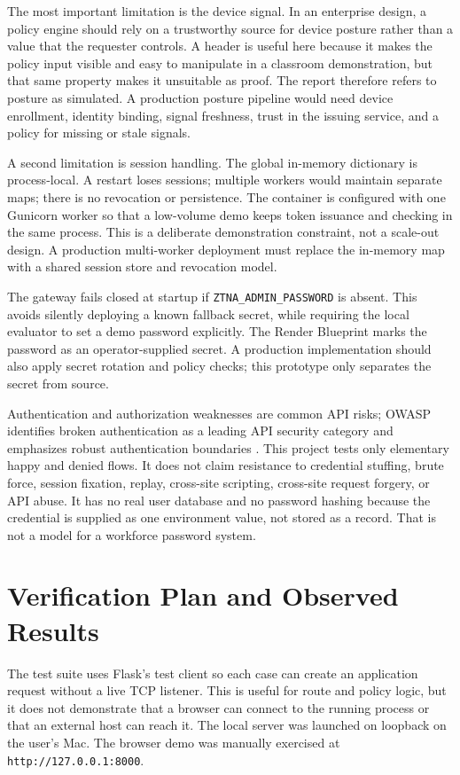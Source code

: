 The most important limitation is the device signal. In an enterprise design, a policy engine should rely on a trustworthy source for device posture rather than a value that the requester controls. A header is useful here because it makes the policy input visible and easy to manipulate in a classroom demonstration, but that same property makes it unsuitable as proof. The report therefore refers to posture as simulated. A production posture pipeline would need device enrollment, identity binding, signal freshness, trust in the issuing service, and a policy for missing or stale signals.

A second limitation is session handling. The global in-memory dictionary is process-local. A restart loses sessions; multiple workers would maintain separate maps; there is no revocation or persistence. The container is configured with one Gunicorn worker so that a low-volume demo keeps token issuance and checking in the same process. This is a deliberate demonstration constraint, not a scale-out design. A production multi-worker deployment must replace the in-memory map with a shared session store and revocation model.

The gateway fails closed at startup if \texttt{ZTNA\_ADMIN\_PASSWORD} is absent. This avoids silently deploying a known fallback secret, while requiring the local evaluator to set a demo password explicitly. The Render Blueprint marks the password as an operator-supplied secret. A production implementation should also apply secret rotation and policy checks; this prototype only separates the secret from source.

Authentication and authorization weaknesses are common API risks; OWASP identifies broken authentication as a leading API security category and emphasizes robust authentication boundaries \cite{owaspApiAuth}. This project tests only elementary happy and denied flows. It does not claim resistance to credential stuffing, brute force, session fixation, replay, cross-site scripting, cross-site request forgery, or API abuse. It has no real user database and no password hashing because the credential is supplied as one environment value, not stored as a record. That is not a model for a workforce password system.

\section{Verification Plan and Observed Results}
The test suite uses Flask's test client so each case can create an application request without a live TCP listener. This is useful for route and policy logic, but it does not demonstrate that a browser can connect to the running process or that an external host can reach it. The local server was launched on loopback on the user's Mac. The browser demo was manually exercised at \texttt{http://127.0.0.1:8000}.

